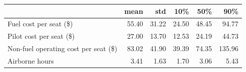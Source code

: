 \begin{tabular}{lrrrrr}
\toprule
 & mean & std & 10\% & 50\% & 90\% \\
\midrule
Fuel cost per seat (\$) & 55.40 & 31.22 & 24.50 & 48.45 & 94.77 \\
Pilot cost per seat (\$) & 27.00 & 13.70 & 12.53 & 24.19 & 44.73 \\
Non-fuel operating cost per seat (\$) & 83.02 & 41.90 & 39.39 & 74.35 & 135.96 \\
Airborne hours & 3.41 & 1.63 & 1.70 & 3.06 & 5.43 \\
\bottomrule
\end{tabular}
\par\vspace{2pt}{\footnotesize Product-level engineering cost shifters built from Form 41 P-5.2, T-100 and the Gulf Coast jet fuel price; 2025Q2 dollars.}
